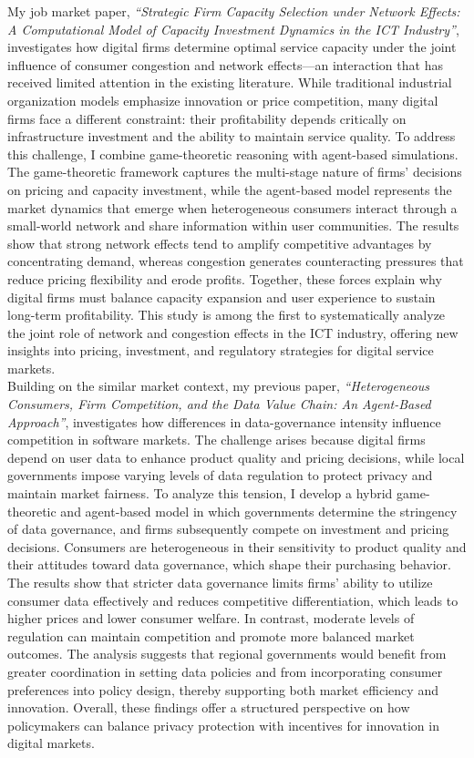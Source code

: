 \documentclass{nfr}
\begin{document}
My job market paper, \textit{``Strategic Firm Capacity Selection under Network Effects: A Computational Model of Capacity Investment Dynamics in the ICT Industry''}, investigates how digital firms determine optimal service capacity under the joint influence of consumer congestion and network effects---an interaction that has received limited attention in the existing literature. While traditional industrial organization models emphasize innovation or price competition, many digital firms face a different constraint: their profitability depends critically on infrastructure investment and the ability to maintain service quality. To address this challenge, I combine game-theoretic reasoning with agent-based simulations. The game-theoretic framework captures the multi-stage nature of firms’ decisions on pricing and capacity investment, while the agent-based model represents the market dynamics that emerge when heterogeneous consumers interact through a small-world network and share information within user communities. The results show that strong network effects tend to amplify competitive advantages by concentrating demand, whereas congestion generates counteracting pressures that reduce pricing flexibility and erode profits. Together, these forces explain why digital firms must balance capacity expansion and user experience to sustain long-term profitability. This study is among the first to systematically analyze the joint role of network and congestion effects in the ICT industry, offering new insights into pricing, investment, and regulatory strategies for digital service markets.\\

Building on the similar market context, my previous paper, \textit{``Heterogeneous Consumers, Firm Competition, and the Data Value Chain: An Agent-Based Approach''}, investigates how differences in data-governance intensity influence competition in software markets. The challenge arises because digital firms depend on user data to enhance product quality and pricing decisions, while local governments impose varying levels of data regulation to protect privacy and maintain market fairness. 
To analyze this tension, I develop a hybrid game-theoretic and agent-based model in which governments determine the stringency of data governance, and firms subsequently compete on investment and pricing decisions. 
Consumers are heterogeneous in their sensitivity to product quality and their attitudes toward data governance, which shape their purchasing behavior. 
The results show that stricter data governance limits firms’ ability to utilize consumer data effectively and reduces competitive differentiation, which leads to higher prices and lower consumer welfare. In contrast, moderate levels of regulation can maintain competition and promote more balanced market outcomes. The analysis suggests that regional governments would benefit from greater coordination in setting data policies and from incorporating consumer preferences into policy design, thereby supporting both market efficiency and innovation. Overall, these findings offer a structured perspective on how policymakers can balance privacy protection with incentives for innovation in digital markets.\\
\end{document}
